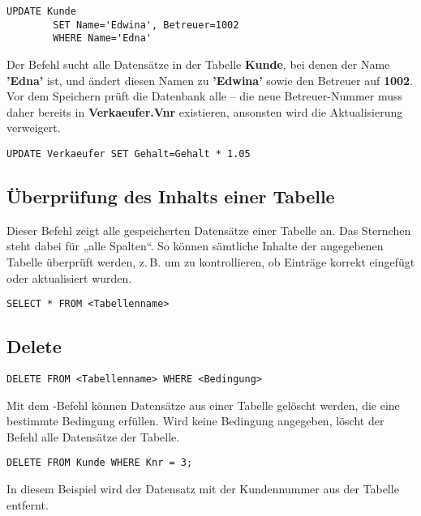     \begin{lstlisting}[style=sqlstyle]
    UPDATE Kunde
        SET Name='Edwina', Betreuer=1002
        WHERE Name='Edna'
    \end{lstlisting}
Der Befehl sucht alle Datensätze in der Tabelle \textbf{Kunde}, bei denen der Name \textbf{'Edna'} ist, 
und ändert diesen Namen zu \textbf{'Edwina'} sowie den Betreuer auf \textbf{1002}. 
Vor dem Speichern prüft die Datenbank alle  – 
die neue Betreuer-Nummer muss daher bereits in \textbf{Verkaeufer.Vnr} existieren, 
ansonsten wird die Aktualisierung verweigert.

    \begin{lstlisting}[style=sqlstyle]
        UPDATE Verkaeufer SET Gehalt=Gehalt * 1.05
    \end{lstlisting}


\subsection{Überprüfung des Inhalts einer Tabelle}
    Dieser Befehl zeigt alle gespeicherten Datensätze einer Tabelle an.  
    Das Sternchen \rCode{*} steht dabei für „alle Spalten“.  
    So können sämtliche Inhalte der angegebenen Tabelle überprüft werden, 
    z.\,B. um zu kontrollieren, ob Einträge korrekt eingefügt oder aktualisiert wurden.

    \begin{lstlisting}[style=sqlstyle]
        SELECT * FROM <Tabellenname>
    \end{lstlisting}



\subsection{Delete}
    \begin{lstlisting}[style=sqlstyle]
DELETE FROM <Tabellenname> WHERE <Bedingung>
    \end{lstlisting}

    Mit dem -Befehl können Datensätze aus einer Tabelle gelöscht werden, 
    die eine bestimmte Bedingung erfüllen. Wird keine Bedingung angegeben, 
    löscht der Befehl  alle Datensätze der Tabelle.

    \begin{lstlisting}[style=sqlstyle]
        DELETE FROM Kunde WHERE Knr = 3;
    \end{lstlisting}
    In diesem Beispiel wird der Datensatz mit der Kundennummer  aus der Tabelle  entfernt.

